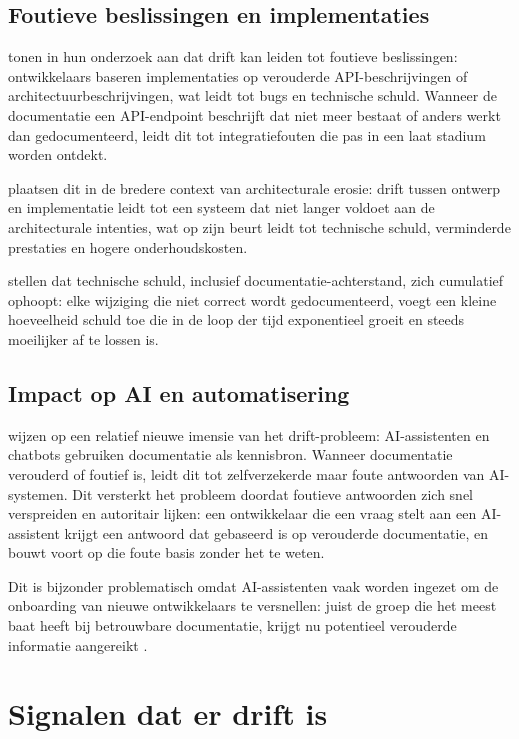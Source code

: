 \subsection{Foutieve beslissingen en implementaties}
\textcite{romeo2024didrift} tonen in hun onderzoek aan dat drift kan leiden tot foutieve beslissingen: ontwikkelaars baseren implementaties op verouderde API-beschrijvingen of architectuurbeschrijvingen, wat leidt tot bugs en technische schuld. Wanneer de documentatie een API-endpoint beschrijft dat niet meer bestaat of anders werkt dan gedocumenteerd, leidt dit tot integratiefouten die pas in een laat stadium worden ontdekt.

\textcite{whiting2020drifterosion} plaatsen dit in de bredere context van architecturale erosie: drift tussen ontwerp en implementatie leidt tot een systeem dat niet langer voldoet aan de architecturale intenties, wat op zijn beurt leidt tot technische schuld, verminderde prestaties en hogere onderhoudskosten.

\textcite{tripathy2014softwareevolution} stellen dat technische schuld, inclusief documentatie-achterstand, zich cumulatief ophoopt: elke wijziging die niet correct wordt gedocumenteerd, voegt een kleine hoeveelheid schuld toe die in de loop der tijd exponentieel groeit en steeds moeilijker af te lossen is.

\subsection{Impact op AI en automatisering}
\textcite{theunissen2022mappingdocumentation} wijzen op een relatief nieuwe imensie van het drift-probleem: AI-assistenten en chatbots gebruiken documentatie als kennisbron. Wanneer documentatie verouderd of foutief is, leidt dit tot zelfverzekerde maar foute antwoorden van AI-systemen. Dit versterkt het probleem doordat foutieve antwoorden zich snel verspreiden en autoritair lijken: een ontwikkelaar die een vraag stelt aan een AI-assistent krijgt een antwoord dat gebaseerd is op verouderde documentatie, en bouwt voort op die foute basis zonder het te weten.

Dit is bijzonder problematisch omdat AI-assistenten vaak worden ingezet om de onboarding van nieuwe ontwikkelaars te versnellen: juist de groep die het meest baat heeft bij betrouwbare documentatie, krijgt nu potentieel verouderde informatie aangereikt \autocite{bhatti2021docsdevelopers}.

\section{Signalen dat er drift is}
\label{sec:drift-signalen}

